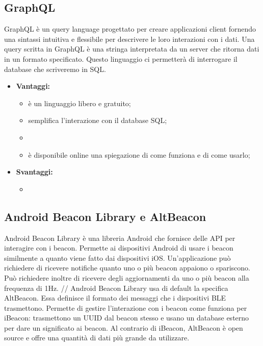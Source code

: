 \subsection{GraphQL} 
	GraphQL è un query language progettato per creare applicazioni client fornendo una sintassi intuitiva e flessibile per descrivere le loro interazioni con i dati.
	Una query scritta in GraphQL è una stringa interpretata da un server che ritorna dati in un formato specificato. 
	Questo linguaggio ci permetterà di interrogare il database che scriveremo in SQL.
	
	\begin{itemize} %
		\item \textbf{Vantaggi:}
			\begin{itemize}
				\item è un linguaggio libero e gratuito;
				\item semplifica l'interazione con il database SQL;
				\item \item è disponibile online una spiegazione di come funziona e di come usarlo; %
			\end{itemize}
		\item \textbf{Svantaggi:}
			\begin{itemize}
				\item
			\end{itemize}
	\end{itemize}

\subsection{Android Beacon Library e AltBeacon}
	Android Beacon Library è una libreria Android che fornisce delle API per interagire con i beacon. Permette ai dispositivi Android di usare i beacon similmente a quanto viene fatto dai dispositivi iOS. Un'applicazione può richiedere di ricevere notifiche quanto uno o più beacon appaiono o spariscono. Può richiedere inoltre di ricevere degli aggiornamenti da uno o più beacon alla frequenza di 1Hz. //
	Android Beacon Library usa di default la specifica AltBeacon. Essa definisce il formato dei messaggi che i dispositivi BLE trasmettono. Permette di gestire l'interazione con i beacon come funziona per iBeacon: trasmettono un UUID dal beacon stesso e usano un database esterno per dare un significato ai beacon.
	Al contrario di iBeacon, AltBeacon è open source e offre una quantità di dati più grande da utilizzare.
	
